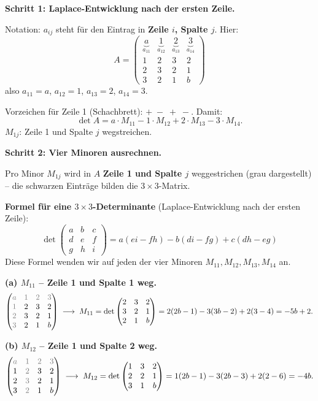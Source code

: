 \documentclass[a4paper,12pt]{article}
\begin{document}
\textbf{Schritt 1: Laplace-Entwicklung nach der ersten Zeile.}

Notation: $a_{ij}$ steht f\"ur den Eintrag in \textbf{Zeile $i$, Spalte $j$}. Hier:
\[
A = \begin{pmatrix}
\underbrace{a}_{a_{11}} & \underbrace{1}_{a_{12}} & \underbrace{2}_{a_{13}} & \underbrace{3}_{a_{14}} \\
1 & 2 & 3 & 2 \\
2 & 3 & 2 & 1 \\
3 & 2 & 1 & b
\end{pmatrix}
\]
also $a_{11} = a$, $a_{12} = 1$, $a_{13} = 2$, $a_{14} = 3$.

Vorzeichen f\"ur Zeile 1 (Schachbrett): $+\;-\;+\;-$. Damit:
\[
\det A = a \cdot M_{11} - 1 \cdot M_{12} + 2 \cdot M_{13} - 3 \cdot M_{14}.
\]
$M_{1j}$: Zeile 1 und Spalte $j$ wegstreichen.

\textbf{Schritt 2: Vier Minoren ausrechnen.}

Pro Minor $M_{1j}$ wird in $A$ \textbf{Zeile 1 und Spalte $j$} weggestrichen (grau dargestellt) -- die schwarzen Eintr\"age bilden die $3\times 3$-Matrix.

\textbf{Formel f\"ur eine $3\times 3$-Determinante} (Laplace-Entwicklung nach der ersten Zeile):
\[
\boxed{\;\det \begin{pmatrix} a & b & c \\ d & e & f \\ g & h & i \end{pmatrix} = a(ei - fh) - b(di - fg) + c(dh - eg)\;}
\]
Diese Formel wenden wir auf jeden der vier Minoren $M_{11}, M_{12}, M_{13}, M_{14}$ an.

\textbf{(a) $M_{11}$ -- Zeile 1 und Spalte 1 weg.}
\[
\begin{pmatrix}
\color{gray}a & \color{gray}1 & \color{gray}2 & \color{gray}3 \\
\color{gray}1 & 2 & 3 & 2 \\
\color{gray}2 & 3 & 2 & 1 \\
\color{gray}3 & 2 & 1 & b
\end{pmatrix}
\;\longrightarrow\;
M_{11} = \det \begin{pmatrix} 2 & 3 & 2 \\ 3 & 2 & 1 \\ 2 & 1 & b \end{pmatrix}
= 2(2b - 1) - 3(3b - 2) + 2(3 - 4)
= -5b + 2.
\]

\textbf{(b) $M_{12}$ -- Zeile 1 und Spalte 2 weg.}
\[
\begin{pmatrix}
\color{gray}a & \color{gray}1 & \color{gray}2 & \color{gray}3 \\
1 & \color{gray}2 & 3 & 2 \\
2 & \color{gray}3 & 2 & 1 \\
3 & \color{gray}2 & 1 & b
\end{pmatrix}
\;\longrightarrow\;
M_{12} = \det \begin{pmatrix} 1 & 3 & 2 \\ 2 & 2 & 1 \\ 3 & 1 & b \end{pmatrix}
= 1(2b - 1) - 3(2b - 3) + 2(2 - 6)
= -4b.
\]
\end{document}
